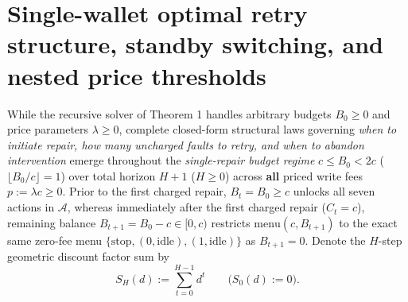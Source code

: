 \documentclass[11pt,letterpaper]{article}
\begin{document}
\section{Single-wallet optimal retry structure, standby switching, and
nested price
thresholds}\label{single-wallet-optimal-retry-structure-standby-switching-and-nested-price-thresholds}

While the recursive solver of Theorem 1 handles arbitrary budgets
\(B_0 \ge 0\) and price parameters \(\lambda \ge 0\), complete
closed-form structural laws governing \emph{when to initiate repair, how
many uncharged faults to retry, and when to abandon intervention} emerge
throughout the \emph{single-repair budget regime} \(c \le B_0 < 2c\)
(\(\lfloor B_0/c\rfloor = 1\)) over total horizon \(H + 1\)
(\(H \ge 0\)) across \textbf{all} priced write fees
\(p := \lambda c \ge 0\). Prior to the first charged repair,
\(B_t = B_0 \ge c\) unlocks all seven actions in \(\mathcal{A}\),
whereas immediately after the first charged repair (\(C_t = c\)),
remaining balance \(B_{t+1} = B_0 - c \in [0, c)\) restricts
\(\mathrm{menu}(c, B_{t+1})\) to the exact same zero-fee menu
\(\{\mathrm{stop}, (0, \mathrm{idle}), (1, \mathrm{idle})\}\) as
\(B_{t+1} = 0\). Denote the \(H\)-step geometric discount factor sum by
\[S_H(d) := \sum_{t=0}^{H-1} d^t \qquad \bigl(S_0(d) := 0\bigr).\]
\end{document}
